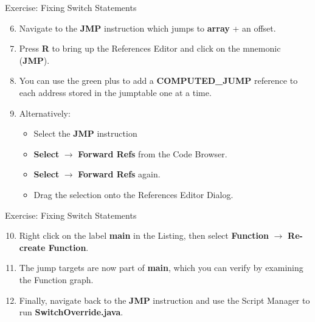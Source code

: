 \documentclass{beamer}
\begin{document}
\begin{frame}
\begin{block}{Exercise: Fixing Switch Statements}
\begin{enumerate}
\setcounter{enumi}{5}
\item Navigate to the \textbf{JMP} instruction which jumps to \textbf{array} + an offset.
\item Press \textbf{R} to bring up the References Editor and click on the mnemonic (\textbf{JMP}).
\item You can use the green plus to add a \textbf{COMPUTED\_JUMP} reference to each address stored in the jumptable one at a time.
\item Alternatively:
\begin{itemize}
\item Select the \textbf{JMP} instruction
\item \textbf{Select} $\rightarrow$ \textbf{Forward Refs} from the Code Browser.
\item \textbf{Select} $\rightarrow$ \textbf{Forward Refs} again.
\item Drag the selection onto the References Editor Dialog.
\end{itemize}
\end{enumerate}
\end{block}
\end{frame}

\begin{frame}
\begin{block}{Exercise: Fixing Switch Statements}
\begin{enumerate}
\setcounter{enumi}{9}
\item Right click on the label \textbf{main} in the Listing, then select \textbf{Function} $\rightarrow$ \textbf{Re-create Function}.
\item The jump targets are now part of \textbf{main}, which you can verify by examining the Function graph.
\item Finally, navigate back to the \textbf{JMP} instruction and use the Script Manager to run \textbf{SwitchOverride.java}.
\end{enumerate}
\end{block}
\end{frame}
\end{document}
